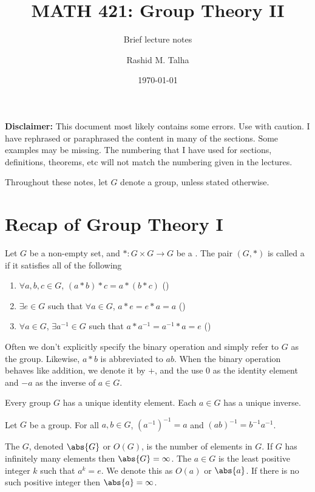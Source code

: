 \documentclass[11pt]{penrose}
\title{MATH 421: Group Theory II}
\subtitle{Brief lecture notes}
\author{Rashid M. Talha}
\affiliation{School of Natural Sciences, NUST}
\date{\today}
\begin{document}
\maketitle

\textbf{Disclaimer:} This document most likely contains some errors. Use with caution. I have rephrased or paraphrased the content in many of the sections. Some examples may be missing. The numbering that I have used for sections, definitions, theorems, etc will not match the numbering given in the lectures.

Throughout these notes, let $G$ denote a group, unless stated otherwise.

\section{Recap of Group Theory I}
\begin{ndfn}[Group]
    Let $G$ be a non-empty set, and $* : G \times G \to G$ be a . The pair $(G, *)$ is called a  if it satisfies all of the following
    \begin{enumerate}
        \item $\forall a, b, c \in G$, $(a * b) * c = a * (b * c)$ \hfill()
        \item $\exists e \in G$ such that $\forall a \in G$, $a * e = e * a = a$ \hfill()
        \item $\forall a \in G$, $\exists a^{-1} \in G$ such that $a * a^{-1} = a^{-1} * a = e$ \hfill()
    \end{enumerate}
\end{ndfn}

Often we don't explicitly specify the binary operation and simply refer to $G$ as the group. Likewise, $a * b$ is abbreviated to $ab$. When the binary operation behaves like addition, we denote it by $+$, and the use $0$ as the identity element and $-a$ as the inverse of $a \in G$.

\begin{nthm}
    Every group $G$ has a unique identity element. Each $a \in G$ has a unique inverse.
\end{nthm}

\begin{nthm}
    Let $G$ be a group. For all $a, b \in G$, $(a^{-1})^{-1} = a$ and $(ab)^{-1} = b^{-1} a^{-1}$.
\end{nthm}

\begin{ndfn}
    The  $G$, denoted $\abs{G}$ or $O(G)$, is the number of elements in $G$. If $G$ has infinitely many elements then $\abs{G} = \infty$. The  $a \in G$ is the least positive integer $k$ such that $a^k = e$. We denote this as $O(a)$ or $\abs{a}$. If there is no such positive integer then $\abs{a} = \infty$.
\end{ndfn}
\end{document}
